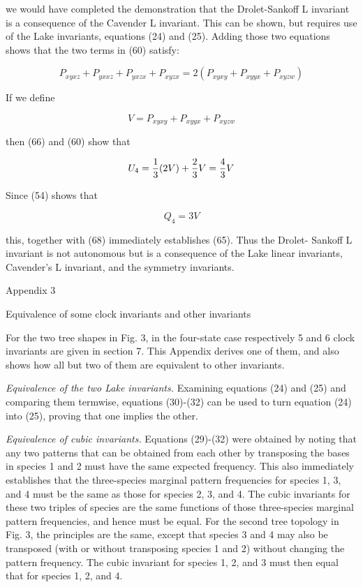 we would have completed the demonstration that the Drolet-Sankoff L invariant
is a consequence of the Cavender L invariant.  This can be shown, but requires
use of the Lake invariants, equations (24) and (25).  Adding those two
equations shows that the two terms in (60) satisfy:

\begin{equation}
P_{xyxz}+P_{yxxz}+P_{yxzx}+P_{xyzx} = 2 (P_{xyxy}+P_{xyyx}+P_{xyzw})
\end{equation}

If we define

\begin{equation}
V = P_{xyxy}+P_{xyyx}+P_{xyzw}
\end{equation}

then (66) and (60) show that

\begin{equation}
U_4 = {1 \over 3} (2V) + {2 \over 3} V =  {4 \over 3}V
\end{equation}

Since (54) shows that

\begin{equation}
Q_4 = 3V
\end{equation}

this, together with (68) immediately establishes (65).  Thus the Drolet-
Sankoff L invariant is not autonomous but is a consequence of the
Lake linear invariants, Cavender's L invariant, and the symmetry invariants.
\bigskip

\centerline{Appendix 3}
\medskip

\centerline{Equivalence of some clock invariants and other invariants}
\medskip

For the two tree shapes in Fig. 3, in the four-state case respectively 5 and 
6 clock invariants are given in section 7.  This Appendix derives one of them,
and also shows how all but two of them are equivalent to other invariants.

{\it Equivalence of the two Lake invariants.}  Examining equations (24) and 
(25) and comparing them termwise, equations (30)-(32) can be used to turn
equation (24) into (25), proving that one implies the other.

{\it Equivalence of cubic invariants.}  Equations (29)-(32) were obtained by
noting that any two patterns that can be obtained from each other by
transposing the bases in species 1 and 2 must have the same expected
frequency.  This also immediately establishes that the three-species
marginal pattern frequencies for species 1, 3, and 4 must be the same as
those for species 2, 3, and 4.  The cubic invariants for these two triples of
species are the same functions of those three-species marginal pattern 
frequencies, and hence must be equal.   For the second tree topology in
Fig. 3, the principles are the same, except that species 3 and 4 may
also be transposed (with or without transposing species 1 and 2) without
changing the pattern frequency.  The cubic invariant for species
1, 2, and 3 must then equal that for species 1, 2, and 4.

